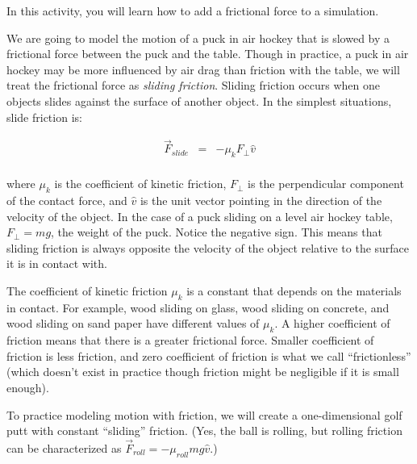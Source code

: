 

\apparatus


\longgoal

In this activity, you will learn how to add a frictional force to a simulation.
\introduction

We are going to model the motion of a puck in air hockey that is slowed by a frictional force between the puck and the table. Though in practice, a puck in air hockey may be more influenced by air drag than friction with the table, we will treat the frictional force as \emph{sliding friction}.  Sliding friction occurs when one objects slides against the surface of another object. In the simplest situations, slide friction is:

\begin{eqnarray*}
	\vec{F}_{slide} & = & -\mu_k F_{\perp}\hat{v} \\
\end{eqnarray*}

where $\mu_k$ is the coefficient of kinetic friction, $F_{\perp}$ is the perpendicular component of the contact force, and $\hat{v}$ is the unit vector pointing in the direction of the velocity of the object. In the case of a puck sliding on a level air hockey table, $F_{\perp}=mg$, the weight of the puck. Notice the negative sign. This means that sliding friction is always opposite the velocity of the object relative to the surface it is in contact with.

The coefficient of kinetic friction $\mu_k$ is a constant that depends on the materials in contact. For example, wood sliding on glass, wood sliding on concrete, and wood sliding on sand paper have different values of $\mu_k$. A higher coefficient of friction means that there is a greater frictional force. Smaller coefficient of friction is less friction, and zero coefficient of friction is what we call ``frictionless'' (which doesn't exist in practice though friction might be negligible if it is small enough).

\procedure

To practice modeling motion with friction, we will create a one-dimensional golf putt with constant ``sliding'' friction. (Yes, the ball is rolling, but rolling friction can be characterized as $\vec{F}_{roll} = -\mu_{roll} mg\hat{v}$.)

